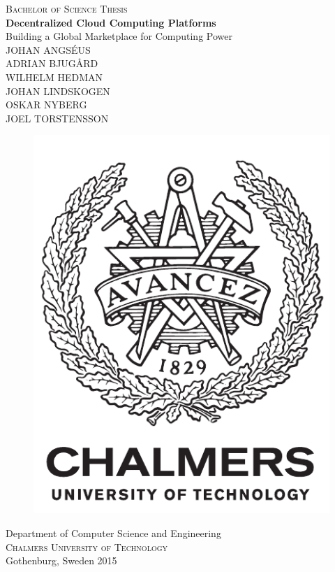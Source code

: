 \newpage
\restoregeometry
\thispagestyle{empty}
\mbox{}


\newpage
{}			%
\thispagestyle{empty}
\begin{center}
	\textsc{\large Bachelor of Science Thesis}\\[4cm]
	\textbf{\large Decentralized Cloud Computing Platforms} \\[1cm]
	{\large Building a Global Marketplace for Computing Power}\\[1cm]
	{\large JOHAN ANGSÉUS\\
	        ADRIAN BJUGÅRD\\
	        WILHELM HEDMAN\\
	        JOHAN LINDSKOGEN\\
	        OSKAR NYBERG\\
	        JOEL TORSTENSSON\\}
	
	\vfill	
	\begin{figure}[h!]
	\centering
	\includegraphics[width=0.2\pdfpagewidth]{figure/auxiliary/logo_eng.pdf} \\	
	\end{figure}	\vspace{5mm}	
	
	Department of Computer Science and Engineering \\
	\textsc{Chalmers University of Technology} \\
	Gothenburg, Sweden 2015 \\
\end{center}


